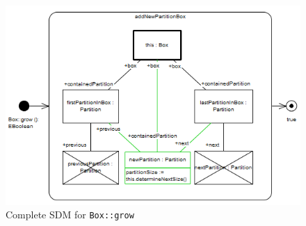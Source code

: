 \begin{stepbystep}
\begin{figure}[htbp]
\begin{center}
  \includegraphics[width=\textwidth]{../../org.moflon.doc.handbook.03_storyDiagrams/08_growBox/visGBImages/ea_growFinal}
  \caption{Complete SDM for \texttt{Box::grow}}  
  \label{ea:growComplete}
\end{center}
\end{figure}
\FloatBarrier

\end{stepbystep}
